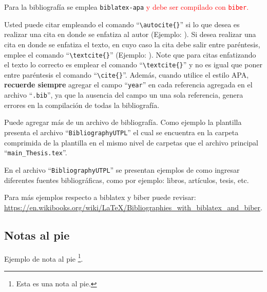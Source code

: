 Para la bibliografía se emplea \lstinline|biblatex-apa| \textcolor{red}{y debe ser compilado con \lstinline|biber|.} 

Usted puede citar empleando el comando ``\lstinline|\autocite{}|'' si lo que desea es realizar una cita en donde se enfatiza al autor (Ejemplo: \autocite{sandoval2017hybrid}). Si desea realizar una cita en donde se enfatiza el texto, en cuyo caso la cita debe salir entre paréntesis, emplee el comando ``\lstinline|\textcite{}|'' (Ejemplo: \textcite{sandoval2017hybrid}). Note que para citas enfatizando el texto lo correcto es emplear el comando ``\lstinline|\textcite{}|'' y no es igual que poner entre paréntesis el comando ``\lstinline|\cite{}|''. Además, cuando utilice el estilo APA, \textbf{recuerde siempre} agregar el campo ``\lstinline|year|'' en cada referencia agregada en el archivo ``\lstinline|.bib|'', ya que la ausencia del campo un una sola referencia, genera errores en la compilación de todas la bibliografía.

Puede agregar más de un archivo de bibliografía. Como ejemplo la plantilla presenta el archivo ``\lstinline|BibliographyUTPL|'' el cual se encuentra en la carpeta comprimida de la plantilla en el mismo nivel de carpetas que el archivo principal ``\lstinline|main_Thesis.tex|''.
 
En el archivo ``\lstinline|BibliographyUTPL|'' se presentan ejemplos de como ingresar diferentes fuentes bibliográficas, como por ejemplo: libros, artículos, tesis, etc. 

Para más ejemplos respecto a biblatex y biber puede revisar: \url{https://en.wikibooks.org/wiki/LaTeX/Bibliographies_with_biblatex_and_biber}.

\subsection{Notas al pie}

Ejemplo de nota al pie \footnote{Esta es una nota al pie.}. 




